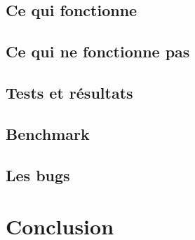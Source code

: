 \documentclass[12pt]{article}
\begin{document}
\subsection{Ce qui fonctionne}

\subsection{Ce qui ne fonctionne pas}

\subsection{Tests et résultats}

\subsection{Benchmark}

\subsection{Les bugs}

\section{Conclusion}
\printglossaries
\printbibliography
 
\end{document}
